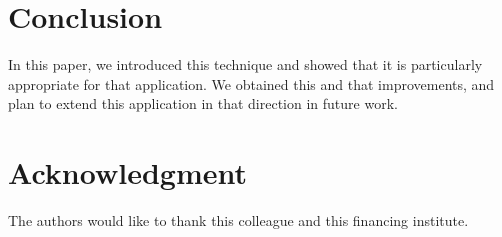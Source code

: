 \documentclass[10pt, conference]{IEEEtran}
\begin{document}
\section{Conclusion}
%
In this paper, we introduced this technique and showed that it is particularly appropriate for that application. We obtained this and that improvements, and plan to extend this application in that direction in future work.



\iffinal
\section*{Acknowledgment}
%
The authors would like to thank this colleague and this financing institute.
\fi







\end{document}
